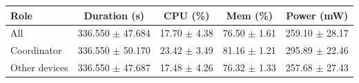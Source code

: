 \begin{tabular}{lcccc}
\hline
\textbf{Role} & \textbf{Duration (s)} & \textbf{CPU (\%)} & \textbf{Mem (\%)} & \textbf{Power (mW)} \\
\hline
All & 336.550 $\pm$ 47.684 & 17.70 $\pm$ 4.38 & 76.50 $\pm$ 1.61 & 259.10 $\pm$ 28.17 \\
Coordinator & 336.550 $\pm$ 50.170 & 23.42 $\pm$ 3.49 & 81.16 $\pm$ 1.21 & 295.89 $\pm$ 22.46 \\
Other devices & 336.550 $\pm$ 47.687 & 17.48 $\pm$ 4.26 & 76.32 $\pm$ 1.33 & 257.68 $\pm$ 27.43 \\
\hline
\end{tabular}
